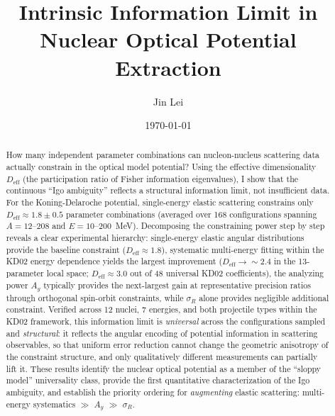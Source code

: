 \documentclass[aps,prl,reprint,superscriptaddress,showpacs]{revtex4-2}
\begin{document}
\title{Intrinsic Information Limit in Nuclear Optical Potential Extraction}

\author{Jin Lei}

\date{\today}

\begin{abstract}
How many independent parameter combinations can nucleon-nucleus scattering data actually constrain in the optical model potential? Using the effective dimensionality $D_\mathrm{eff}$ (the participation ratio of Fisher information eigenvalues), I show that the continuous ``Igo ambiguity'' reflects a structural information limit, not insufficient data. For the Koning-Delaroche potential, single-energy elastic scattering constrains only $D_\mathrm{eff} \approx 1.8 \pm 0.5$ parameter combinations (averaged over 168 configurations spanning $A = 12$--$208$ and $E = 10$--$200$~MeV). Decomposing the constraining power step by step reveals a clear experimental hierarchy: single-energy elastic angular distributions provide the baseline constraint ($D_\mathrm{eff} \approx 1.8$), systematic multi-energy fitting within the KD02 energy dependence yields the largest improvement ($D_\mathrm{eff} \to \sim\!2.4$ in the 13-parameter local space; $D_\mathrm{eff} \approx 3.0$ out of 48 universal KD02 coefficients), the analyzing power $A_y$ typically provides the next-largest gain at representative precision ratios through orthogonal spin-orbit constraints, while $\sigma_R$ alone provides negligible additional constraint. Verified across 12 nuclei, 7 energies, and both projectile types within the KD02 framework, this information limit is \emph{universal} across the configurations sampled and \emph{structural}: it reflects the angular encoding of potential information in scattering observables, so that uniform error reduction cannot change the geometric anisotropy of the constraint structure, and only qualitatively different measurements can partially lift it. These results identify the nuclear optical potential as a member of the ``sloppy model'' universality class, provide the first quantitative characterization of the Igo ambiguity, and establish the priority ordering for \emph{augmenting} elastic scattering: multi-energy systematics $\gg$ $A_y$ $\gg$ $\sigma_R$.
\end{abstract}


\maketitle
\end{document}
